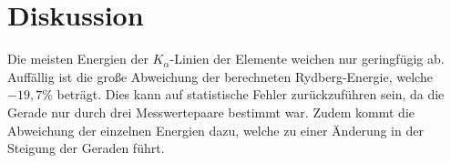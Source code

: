 \section{Diskussion}
\label{sec:Diskussion}
Die meisten Energien der $K_{\alpha}$-Linien der Elemente weichen nur geringfügig ab.
Auffällig ist die große Abweichung der berechneten Rydberg-Energie, welche $-19,7\%$ beträgt. Dies kann auf statistische
Fehler zurückzuführen sein, da die Gerade nur durch drei Messwertepaare bestimmt war. Zudem kommt die Abweichung der einzelnen
Energien dazu, welche zu einer Änderung in der Steigung der Geraden führt.

